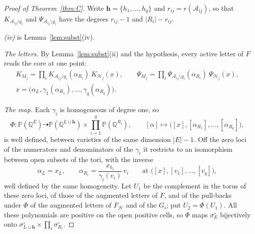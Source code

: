 \documentclass[11pt]{article}
\theoremstyle{plain}
\theoremstyle{definition}
\theoremstyle{remark}
\newcommand{\Q}{\mathbb Q}
\newcommand{\PP}{\mathbb P}
\begin{document}
\begin{proof}[Proof of Theorem~\ref{thm:C}]
Write $\mathbf h=\{h_1,\dots,h_q\}$ and $r_{ij}=r(\mathcal A_{ij})$, so that $K_{\mathcal A_{ij}/g_i}$ and $\Psi_{\mathcal A_{ij}\setminus g_i}$ have the degrees $r_{ij}-1$ and $|R_i|-r_{ij}$.

\emph{(iv)} is Lemma~\ref{lem:subst}(iv).

\emph{The letters.} By Lemma~\ref{lem:subst}(ii) and the hypothesis, every active letter of $F$ reads the core at one point:
\begin{gather*}
K_{M_j}=\prod_iK_{\mathcal A_{ij}/g_i}(\alpha_{R_i})\ K_{\mathcal H_j}(x),\qquad \Psi_{M_j}=\prod_i\Psi_{\mathcal A_{ij}\setminus g_i}(\alpha_{R_i})\ \Psi_{\mathcal H_j}(x),\\
x=\big(\alpha_L,\gamma_1(\alpha_{R_1}),\dots,\gamma_q(\alpha_{R_q})\big).
\end{gather*}

\emph{The map.} Each $\gamma_i$ is homogeneous of degree one, so
\[
\Phi:\PP(\Q^E)\dashrightarrow\PP(\Q^{L\sqcup\mathbf h})\times\prod_{i=1}^q\PP(\Q^{R_i}),\qquad[\alpha]\mapsto\big([x],[\alpha_{R_1}],\dots,[\alpha_{R_q}]\big),
\]
is well defined, between varieties of the same dimension $|E|-1$. Off the zero loci of the numerators and denominators of the $\gamma_i$ it restricts to an isomorphism between open subsets of the tori, with the inverse
\[
\alpha_L=x_L,\qquad \alpha_{R_i}=\frac{x_{h_i}}{\gamma_i(v_i)}\,v_i\qquad\text{at }\big([x],[v_1],\dots,[v_q]\big),
\]
well defined by the same homogeneity. Let $U_1$ be the complement in the torus of these zero loci, of those of the augmented letters of $F$, and of the pull-backs under $\Phi$ of the augmented letters of $F_{\mathcal H}$ and of the $G_i$; put $U_2=\Phi(U_1)$. All these polynomials are positive on the open positive cells, so $\Phi$ maps $\sigma^\circ_E$ bijectively onto $\sigma^\circ_{L\sqcup\mathbf h}\times\prod_i\sigma^\circ_{R_i}$.


\end{proof}
\end{document}
